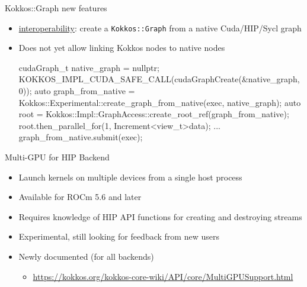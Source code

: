 \begin{frame}[fragile]{Kokkos::Graph new features}
 \begin{itemize}
   \item \href{https://github.com/kokkos/kokkos/pull/7664}{interoperability}: create a \texttt{Kokkos::Graph} from a native Cuda/HIP/Sycl graph
   \item Does not yet allow linking Kokkos nodes to native nodes
     \begin{code}[keywords={auto}]
cudaGraph_t native_graph = nullptr;
KOKKOS_IMPL_CUDA_SAFE_CALL(cudaGraphCreate(&native_graph, 0));
auto graph_from_native =
  Kokkos::Experimental::create_graph_from_native(exec, native_graph);
auto root = Kokkos::Impl::GraphAccess::create_root_ref(graph_from_native);
root.then_parallel_for(1, Increment<view_t>{data});
...
graph_from_native.submit(exec);
     \end{code}
 \end{itemize}
\end{frame}





\begin{frame}[fragile]{Multi-GPU for HIP Backend}
  \begin{itemize}
    \item Launch kernels on multiple devices from a single host process
    \item Available for ROCm 5.6 and later
    \item Requires knowledge of HIP API functions for creating and destroying streams
    \item Experimental, still looking for feedback from new users
    \item Newly documented (for all backends)  
      \begin{itemize} 
        \item[] \url{https://kokkos.org/kokkos-core-wiki/API/core/MultiGPUSupport.html}
      \end{itemize}
  \end{itemize}
\end{frame}

